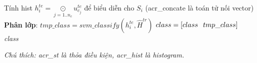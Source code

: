 \begin{algorithm}
\begin{algorithmic}
\begin{enumerate}
			\State Tính hist $h_i^{te} = \mathop  \odot \limits_{j = 1..{n_c}} u_{c_j}^{te}$ để biểu diễn cho $S_i$ (\gls{acr_concate} là toán tử nối vector)
			\State \textbf{Phân lớp}: $tmp\_class = svm\_classify(h_i^{te}, \hat H^{tr})$ 
			\State $class = [class\hspace{0.1in} tmp\_class]$
		\EndFor \\
		\Return \textit{class}	
	\end{enumerate}		
	\end{algorithmic}
\textit{	Chú thích: \gls{acr_st} là thỏa điều kiện, \gls{acr_hist} là histogram.}
	\end{algorithm}

